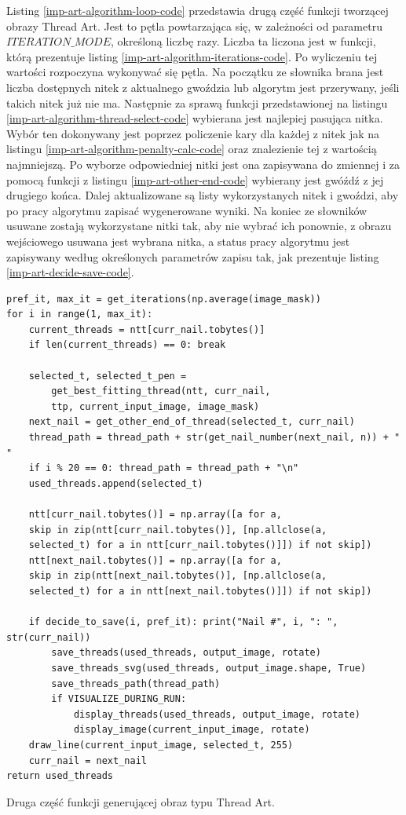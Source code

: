         Listing \ref{imp-art-algorithm-loop-code} przedstawia drugą część funkcji tworzącej obrazy Thread Art. Jest to pętla powtarzająca się, w zależności od parametru \(ITERATION\_MODE\), określoną liczbę razy. Liczba ta liczona jest w funkcji, którą prezentuje listing \ref{imp-art-algorithm-iterations-code}. Po wyliczeniu tej wartości rozpoczyna wykonywać się pętla. Na początku ze słownika brana jest liczba dostępnych nitek z aktualnego gwoździa lub algorytm jest przerywany, jeśli takich nitek już nie ma. Następnie za sprawą funkcji przedstawionej na listingu \ref{imp-art-algorithm-thread-select-code} wybierana jest najlepiej pasująca nitka. Wybór ten dokonywany jest poprzez policzenie kary dla każdej z nitek jak na listingu \ref{imp-art-algorithm-penalty-calc-code} oraz znalezienie tej z wartością najmniejszą. Po wyborze odpowiedniej nitki jest ona zapisywana do zmiennej i za pomocą funkcji z listingu \ref{imp-art-other-end-code} wybierany jest gwóźdź z jej drugiego końca. Dalej aktualizowane są listy wykorzystanych nitek i gwoździ, aby po pracy algorytmu zapisać wygenerowane wyniki. Na koniec ze słowników usuwane zostają wykorzystane nitki tak, aby nie wybrać ich ponownie, z obrazu wejściowego usuwana jest wybrana nitka, a status pracy algorytmu jest zapisywany według określonych parametrów zapisu tak, jak prezentuje listing \ref{imp-art-decide-save-code}.
        \begin{code}[H]
        \begin{verbatim}
pref_it, max_it = get_iterations(np.average(image_mask))
for i in range(1, max_it):
    current_threads = ntt[curr_nail.tobytes()]
    if len(current_threads) == 0: break 

    selected_t, selected_t_pen =
        get_best_fitting_thread(ntt, curr_nail, 
        ttp, current_input_image, image_mask)
    next_nail = get_other_end_of_thread(selected_t, curr_nail)
    thread_path = thread_path + str(get_nail_number(next_nail, n)) + " "
    if i % 20 == 0: thread_path = thread_path + "\n"
    used_threads.append(selected_t)

    ntt[curr_nail.tobytes()] = np.array([a for a, 
    skip in zip(ntt[curr_nail.tobytes()], [np.allclose(a, 
    selected_t) for a in ntt[curr_nail.tobytes()]]) if not skip])
    ntt[next_nail.tobytes()] = np.array([a for a, 
    skip in zip(ntt[next_nail.tobytes()], [np.allclose(a, 
    selected_t) for a in ntt[next_nail.tobytes()]]) if not skip])
    
    if decide_to_save(i, pref_it): print("Nail #", i, ": ", str(curr_nail))
        save_threads(used_threads, output_image, rotate)
        save_threads_svg(used_threads, output_image.shape, True)
        save_threads_path(thread_path)
        if VISUALIZE_DURING_RUN:
            display_threads(used_threads, output_image, rotate)
            display_image(current_input_image, rotate)
    draw_line(current_input_image, selected_t, 255)
    curr_nail = next_nail
return used_threads
        \end{verbatim}
        \caption{Druga część funkcji generującej obraz typu Thread Art.}
        \label{imp-art-algorithm-loop-code}
        \end{code}
        

